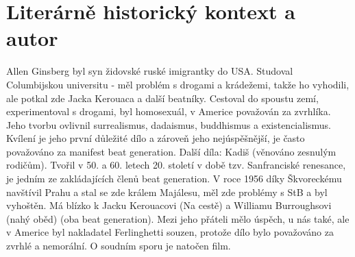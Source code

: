 \documentclass[11pt]{article}
\begin{document}
    \section*{Literárně historický kontext a autor}
    Allen Ginsberg byl syn židovské ruské imigrantky do USA. Studoval Columbijskou universitu - měl problém s drogami a krádežemi, takže ho vyhodili, ale potkal zde Jacka Kerouaca a další beatníky.
    Cestoval do spoustu zemí, experimentoval s drogami, byl homosexuál, v Americe považován za zvrhlíka. Jeho tvorbu ovlivnil surrealismus, dadaismus, buddhismus a existencialismus.
    Kvílení je jeho první důležité dílo a zároveň jeho nejúspěšnější, je často považováno za manifest beat generation. Další díla: Kadiš (věnováno zesnulým rodičům).
    Tvořil v 50. a 60. letech 20. století v době tzv. Sanfranciské renesance, je jedním ze zakládajících členů beat generation. V roce 1956 díky Škvoreckému navštívil Prahu a stal se zde králem Majálesu, měl zde problémy s StB a byl vyhoštěn.
    Má blízko k Jacku Kerouacovi (Na cestě) a Williamu Burroughsovi (nahý oběd) (oba beat generation). Mezi jeho přáteli mělo úspěch, u nás také, ale v Americe byl nakladatel Ferlinghetti souzen, protože dílo bylo považováno za zvrhlé a nemorální. O soudním sporu je natočen film.
\end{document}
